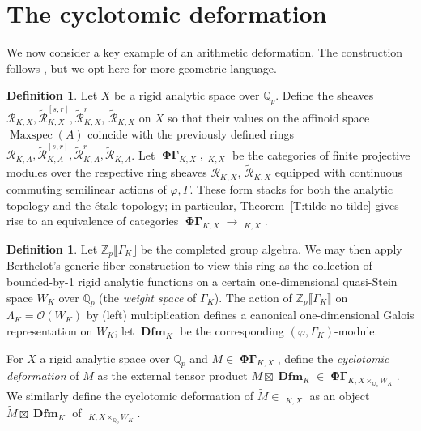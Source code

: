 \documentclass[12pt]{amsart}
\theoremstyle{definition}
\newtheorem{defn}[theorem]{Definition}
\numberwithin{equation}{theorem}
\newcommand{\Qp}{\mathbb{Q}_p}
\newcommand{\QQ}{\mathbb{Q}}
\newcommand{\ZZ}{\mathbb{Z}}
\newcommand{\calO}{\mathcal{O}}
\newcommand{\calR}{\mathcal{R}}
\DeclareMathOperator{\Dfm}{\mathbf{Dfm}}
\DeclareMathOperator{\Maxspec}{Maxspec}
\DeclareMathOperator{\PhiGamma}{\mathbf{\Phi \Gamma}}
\DeclareMathOperator{\PhiGammatilde}{\widetilde{\mathbf{\Phi \Gamma}}}
\begin{document}
\section{The cyclotomic deformation}

We now consider a key example of an arithmetic deformation. The construction follows
\cite[Definition~4.4.7]{kpx}, but we opt here for  more geometric language.

\begin{defn}
Let $X$ be a rigid analytic space over $\QQ_p$. 
Define the sheaves $\calR_{K,X}, \tilde{\calR}^{[s,r]}_{K,X}, \tilde{\calR}^{r}_{K,X}$,
$\tilde{\calR}_{K,X}$ on $X$ so that their values on the affinoid space $\Maxspec(A)$
coincide with the previously defined rings $\calR_{K,A}, \tilde{\calR}^{[s,r]}_{K,A}, \tilde{\calR}^{r}_{K,A}, \tilde{\calR}_{K,A}$.
Let $\PhiGamma_{K,X}, \PhiGammatilde_{K,X}$ be the categories of finite projective
modules over the respective ring sheaves $\calR_{K,X}$, $\tilde{\calR}_{K,X}$ equipped with continuous commuting semilinear actions of $\varphi, \Gamma$. 
These form stacks for both the analytic topology and the \'etale topology; in particular, Theorem~\ref{T:tilde no tilde} gives rise to an equivalence of categories $\PhiGamma_{K,X} \to \PhiGammatilde_{K,X}$.
\end{defn}

\begin{defn}
Let $\ZZ_p \llbracket \Gamma_K \rrbracket$ be the completed group algebra. We may then apply Berthelot's generic fiber construction to view this ring as the collection of bounded-by-1 rigid analytic functions on a certain one-dimensional quasi-Stein space $W_K$ over $\QQ_p$ (the \emph{weight space} of $\Gamma_K$).
The action of $\ZZ_p \llbracket \Gamma_K \rrbracket$ on $\Lambda_K = \calO(W_K)$ by (left) multiplication
defines a canonical one-dimensional Galois representation on $W_K$; let $\Dfm_{K}$ be the corresponding $(\varphi, \Gamma_K)$-module.

For $X$ a rigid analytic space over $\QQ_p$ and $M \in \PhiGamma_{K,X}$,
define the \emph{cyclotomic deformation} of $M$
as the external tensor product $M \boxtimes \Dfm_{K} \in \PhiGamma_{K,X \times_{\Qp} W_K}$. We similarly define the cyclotomic deformation of $\tilde{M} \in \PhiGammatilde_{K,X}$ as an object $\tilde{M} \boxtimes \Dfm_{K}$ of $\PhiGammatilde_{K,X \times_{\Qp} W_K}$.
\end{defn}
\end{document}
